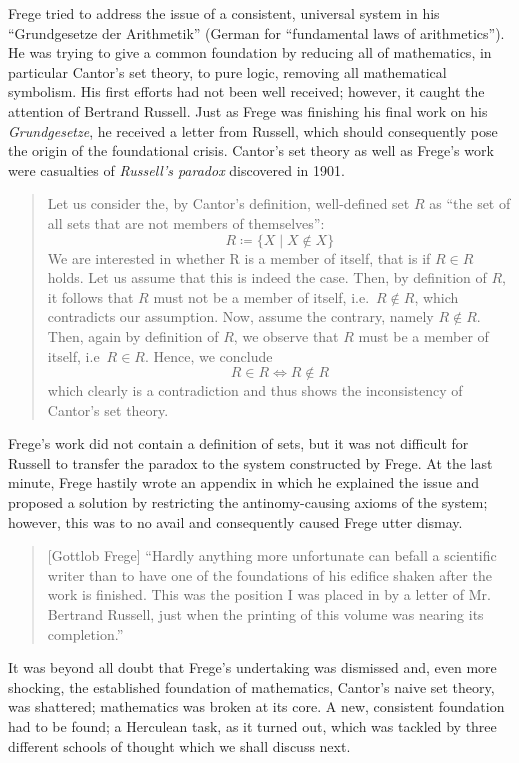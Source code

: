\documentclass[hidelinks]{article}
\theoremstyle{plain}
\theoremstyle{definition}
\theoremstyle{rem}
\begin{document}
Frege tried to address the issue of a consistent, universal system in his ``Grundgesetze der Arithmetik'' (German for ``fundamental laws of arithmetics''). He was trying to give a common foundation by reducing all of mathematics, in particular Cantor's set theory, to pure logic, removing all mathematical symbolism. His first efforts had not been well received; however, it caught the attention of Bertrand Russell. Just as Frege was finishing his final work on his \textit{Grundgesetze}, he received a letter from Russell, which should consequently pose the origin of the foundational crisis. Cantor's set theory as well as Frege's work were casualties of \textit{Russell's paradox} discovered in 1901.
\begin{quote}
Let us consider the, by Cantor's definition, well-defined set $R$ as ``the set of all sets that are not members of themselves'':
\begin{equation*}
	R\coloneqq\{X\mid X\notin X\}
\end{equation*}
We are interested in whether R is a member of itself, that is if $R\in R$ holds.
Let us assume that this is indeed the case. Then, by definition of $R$, it follows that $R$ must not be a member of itself, i.e.\ $R\notin R$, which contradicts our assumption. Now, assume the contrary, namely $R\notin R$. Then, again by definition of $R$, we observe that $R$ must be a member of itself, i.e\ $R\in R$. Hence, we conclude
\begin{equation*}
		R\in R\iff R\notin R
\end{equation*}
which clearly is a contradiction and thus shows the inconsistency of Cantor's set theory.
\end{quote}
Frege's work did not contain a definition of sets, but it was not difficult for Russell to transfer the paradox to the system constructed by Frege. At the last minute, Frege hastily wrote an appendix in which he explained the issue and proposed a solution by restricting the antinomy-causing axioms of the system; however, this was to no avail and consequently caused Frege utter dismay.
\begin{quote}[Gottlob Frege]
``Hardly anything more unfortunate can befall a scientific writer than to have one of the foundations of his edifice shaken after the work is finished. This was the position I was placed in by a letter of Mr. Bertrand Russell, just when the printing of this volume was nearing its completion.''\cite{frege_appendix}
\end{quote}
It was beyond all doubt that Frege's undertaking was dismissed and, even more shocking, the established foundation of mathematics, Cantor's naive set theory, was shattered; mathematics was broken at its core. A new, consistent foundation had to be found; a Herculean task, as it turned out, which was tackled by three different schools of thought which we shall discuss next.
\end{document}
